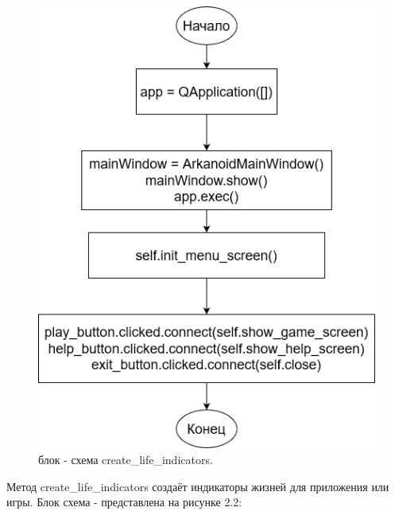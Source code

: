 \begin{figure} [!h]
  \centering
  \graphicspath{ {img/} }
  \includegraphics[width = 15cm]{image/11.drawio.png}
  \caption{блок - схема create\_life\_indicators. }
  \label{fig:image}
\end{figure}

Метод create\_life\_indicators создаёт индикаторы жизней для приложения или игры. Блок схема - представлена на рисунке 2.2:

